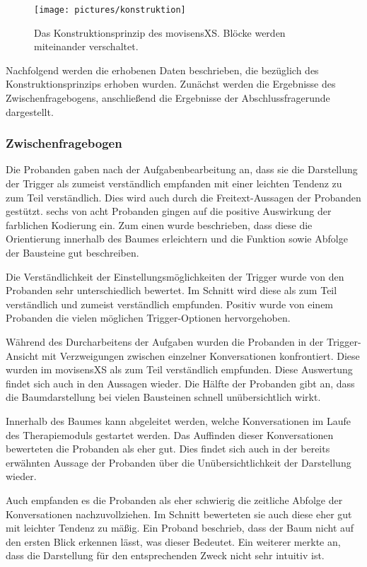 \begin{figure}[h]
\centering
\texttt{[image: pictures/konstruktion]}
\caption{Das Konstruktionsprinzip des movisensXS. Blöcke werden miteinander verschaltet.}
\label{konstruktion}
\end{figure}

Nachfolgend werden die erhobenen Daten beschrieben, die bezüglich des Konstruktionsprinzips erhoben wurden. Zunächst werden die Ergebnisse des Zwischenfragebogens, anschließend die Ergebnisse der Abschlussfragerunde dargestellt.

\subsubsection{Zwischenfragebogen}
Die Probanden gaben nach der Aufgabenbearbeitung an, dass sie die Darstellung der Trigger als zumeist verständlich empfanden mit einer leichten Tendenz zu zum Teil verständlich. Dies wird auch durch die Freitext-Aussagen der Probanden gestützt. sechs von acht Probanden gingen auf die positive Auswirkung der farblichen Kodierung ein. Zum einen wurde beschrieben, dass diese die Orientierung innerhalb des Baumes erleichtern und die Funktion sowie Abfolge der Bausteine gut beschreiben.

Die Verständlichkeit der Einstellungsmöglichkeiten der Trigger wurde von den Probanden sehr unterschiedlich bewertet. Im Schnitt wird diese als zum Teil verständlich und zumeist verständlich empfunden. Positiv wurde von einem Probanden die vielen möglichen Trigger-Optionen hervorgehoben.

Während des Durcharbeitens der Aufgaben wurden die Probanden in der Trigger-Ansicht mit Verzweigungen zwischen einzelner Konversationen konfrontiert. Diese wurden im movisensXS als zum Teil verständlich empfunden. Diese Auswertung findet sich auch in den Aussagen wieder. Die Hälfte der Probanden gibt an, dass die Baumdarstellung bei vielen Bausteinen schnell unübersichtlich wirkt. 

Innerhalb des Baumes kann abgeleitet werden, welche Konversationen im Laufe des Therapiemoduls gestartet werden. Das Auffinden dieser Konversationen bewerteten die Probanden als eher gut. Dies findet sich auch in der bereits erwähnten Aussage der Probanden über die Unübersichtlichkeit der Darstellung wieder. 

Auch empfanden es die Probanden als eher schwierig die zeitliche Abfolge der Konversationen nachzuvollziehen. Im Schnitt bewerteten sie auch diese eher gut mit leichter Tendenz zu mäßig. Ein Proband beschrieb, dass der Baum nicht auf den ersten Blick erkennen lässt, was dieser Bedeutet. Ein weiterer merkte an, dass die Darstellung für den entsprechenden Zweck nicht sehr intuitiv ist. 

